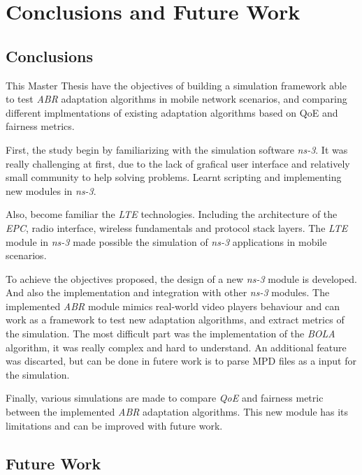 \chapter{Conclusions and Future Work}
\label{chap:conclusions}

\section{Conclusions}

This Master Thesis have the objectives of building a simulation framework
able to test \textit{ABR} adaptation algorithms in mobile network scenarios,
and comparing different implmentations of existing adaptation algorithms 
based on QoE and fairness metrics.

First, the study begin by familiarizing with the simulation software \textit{ns-3}.
It was really challenging at first, due to the lack of grafical user interface
and relatively small community to help solving problems. Learnt scripting
and implementing new modules in \textit{ns-3}.

Also, become familiar the \textit{LTE} technologies. Including the architecture 
of the \textit{EPC}, radio interface, wireless fundamentals and protocol stack layers.
The \textit{LTE} module in \textit{ns-3} made possible the simulation of \textit{ns-3}
applications in mobile scenarios.

To achieve the objectives proposed, the design of a new \textit{ns-3} module is developed.
And also the implementation and integration with other \textit{ns-3} modules. The implemented 
\textit{ABR} module mimics real-world video players behaviour and
can work as a framework to test new adaptation algorithms, and extract
metrics of the simulation. The most difficult part was the implementation of the 
\textit{BOLA} algorithm, it was really complex and hard to understand. An additional
feature was discarted, but can be done in futere work is to parse MPD files as a
input for the simulation.

Finally, various simulations are made to compare \textit{QoE} and fairness metric between
the implemented \textit{ABR} adaptation algorithms. This new module has its limitations
and can be improved with future work. 



\section{Future Work}

